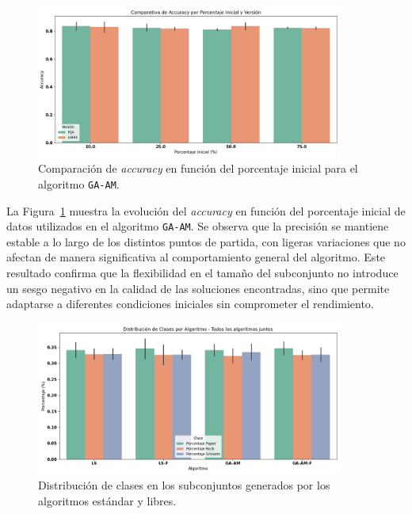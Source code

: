 \begin{figure}[htp]
    \centering
    \includegraphics[width=0.9\textwidth]{imagenes/evaluaciones/libres/am_por_pi.png}
    \caption{Comparación de \textit{accuracy} en función del porcentaje inicial para el algoritmo \texttt{GA-AM}.}
    \label{fig:am_por_pi}
\end{figure}

La Figura~\ref{fig:am_por_pi} muestra la evolución del \textit{accuracy} en función del porcentaje inicial de datos utilizados en el algoritmo \texttt{GA-AM}.
Se observa que la precisión se mantiene estable a lo largo de los distintos puntos de partida,
con ligeras variaciones que no afectan de manera significativa al comportamiento general del algoritmo.
Este resultado confirma que la flexibilidad en el tamaño del subconjunto no introduce un sesgo negativo en la calidad de las soluciones encontradas,
sino que permite adaptarse a diferentes condiciones iniciales sin comprometer el rendimiento.


\begin{figure}[htp]
    \centering
    \includegraphics[width=0.9\textwidth]{imagenes/evaluaciones/libres/distribucion-clases.png}
    \caption{Distribución de clases en los subconjuntos generados por los algoritmos estándar y libres.}
    \label{fig:distribucion_libres}
\end{figure}

